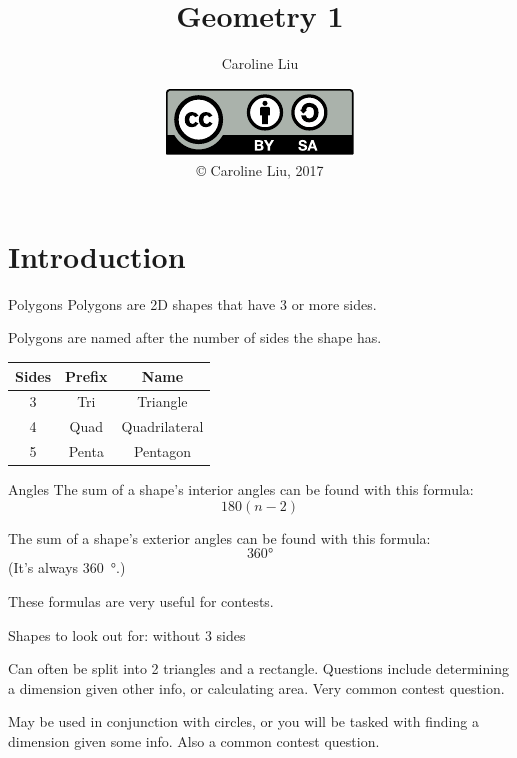 

\usepackage{siunitx}
\usepackage{tikz}
\usepackage{tkz-euclide}

\title{Geometry 1}
\author{Caroline Liu}
\date{\includegraphics{../LicenseLogo}\\\copyright{} Caroline Liu, 2017}


	\frame{\titlepage}
	\section{Introduction}
	\begin{namedframe}{Polygons}
		Polygons are 2D shapes that have 3 or more sides.
		\pause

		Polygons are named after the number of sides the shape has.
		\pause

		\begin{center}
			\begin{tabular}{|c|c|c|}
				\hline
				Sides & Prefix & Name\\\hline
				3     & Tri    & Triangle\\
				4     & Quad   & Quadrilateral\\
				5     & Penta  & Pentagon\\\hline
			\end{tabular}
		\end{center}
	\end{namedframe}
	\begin{namedframe}{Angles}
		The sum of a shape's interior angles can be found with this formula:
		\[180(n-2)\]
		\pause

		The sum of a shape's exterior angles can be found with this formula:
		\[360\si{\degree}\]
		(It's always \SI{360}{\degree}.)
		\pause

		These formulas are \alert{very} useful for contests.
	\end{namedframe}
	\begin{namedframe}{Shapes to look out for: without 3 sides}
		\begin{description}[<+->]
			\item[Trapezoids] Can often be split into 2 triangles and a rectangle. Questions include determining a dimension given other info, or calculating area. Very common contest question.
			\item[Parallelograms, squares, and rectangles] May be used in conjunction with circles, or you will be tasked with finding a dimension given some info. Also a common contest question.
		\end{description}
	\end{namedframe}
